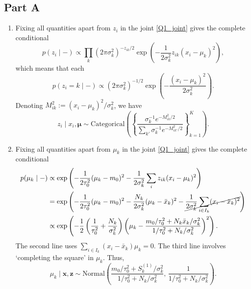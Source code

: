 \documentclass[12pt]{article}
\begin{document}
\subsection*{Part A}
\begin{enumerate}[label=(\alph*)]
    \item Fixing all quantities apart from $z_i$ in the joint \eqref{Q1_joint} gives
    the complete conditional \[
        p(z_i\mid -)
            \propto \prod_k (2\pi\sigma_k^2)^{-z_{ik}/2}\exp\left(-\frac{1}{2\sigma_k^2} z_{ik}(x_i - \mu_k)^2\right),
    \] which means that each \[
        p(z_i = k \mid -) \propto (2\pi\sigma_k^2)^{-1 /2}\exp\left(-\frac{(x_i - \mu_k)^2}{2\sigma_k^2}\right).
    \] Denoting $M_{ik}^2 := (x_i - \mu_k)^2 /\sigma_k^2$, we have \[
        \boxed{
            z_i \mid x_i, \bm{\mu}
                \sim \text{Categorical}\left(\left\{ \frac{\sigma_k^{-1} e^{-M_{ik}^2 / 2}}{\sum_{k'} \sigma_k^{-1} e^{-M_{ik'}^2 / 2}} \right\}_{k = 1}^K\right).
        }
    \]

    \item Fixing all quantities apart from $\mu_k$ in the joint \eqref{Q1_joint} gives
    the complete conditional \begin{align*}
        p(\mu_k \mid -)
            &\propto \exp\left(-\frac{1}{2\tau_0^2}(\mu_k - m_0)^2 - \frac{1}{2\sigma_k^2} \sum_{i} z_{ik}(x_i - \mu_k)^2\right) \\
            &= \exp\left(-\frac{1}{2\tau_0^2}(\mu_k - m_0)^2 - \frac{N_k}{2\sigma_k^2} (\mu_k - \bar{x}_k)^2 - \cancel{\frac{1}{2\sigma_k^2}\sum_{i \in I_k} (x_i - \bar{x}_k)^2}\right) \\
            &\propto \exp\left(-\frac{1}{2}\left(\frac{1}{\tau_0^2} + \frac{N_k}{\sigma_k^2}\right)\left(\mu_k - \frac{m_0 / \tau_0^2 + N_k \bar{x}_k / \sigma_k^2}{1/\tau_0^2 + N_k /\sigma_k^2}\right)^2\right).
    \end{align*}
    The second line uses $\sum_{i \in I_k} (x_i - \bar{x}_k)\mu_k = 0$.
    The third line involves `completing the square' in $\mu_k$.
    Thus, \[
        \boxed{\mu_k \mid \bm{x}, \bm{z} \sim \text{Normal}\left(\frac{m_0 / \tau_0^2 + S_k^{(1)} / \sigma_k^2}{1/\tau_0^2 + N_k /\sigma_k^2},\, \frac{1}{1/\tau_0^2 + N_k /\sigma_k^2}\right).}
    \]
\end{enumerate}
\end{document}
